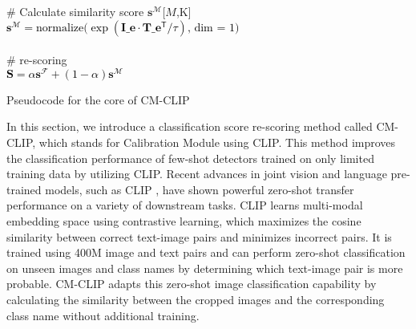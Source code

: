 \documentclass{article}
\newcommand{\PyComment}[1]{\ttfamily\textcolor{commentcolor}{\# #1}}  %
\newcommand{\PyCode}[1]{\ttfamily\textcolor{black}{#1}} %
\begin{document}
\begin{algorithm}[!b]
        \PyComment{Calculate similarity score $\mathbf{s}^\mathcal{M}$[$M$,K] }\\
        \PyCode{ $\mathbf{s}^\mathcal{M} =  \text{normalize(}{\exp(\mathbf{I\_e} \cdot \mathbf{T\_e^\mathsf{T}} \slash \tau )} \text{, dim = 1)}$ }\\
        \PyCode{}\\

        \PyComment{re-scoring }\\
        
        \PyCode{$\mathbf{S} = \alpha \mathbf{s}^\mathcal{F} + (1-\alpha) \mathbf{s}^\mathcal{M}$}
        
    \Indm
    
\caption{Pseudocode for the core of CM-CLIP}
\label{algo:your-algo}
\end{algorithm}

In this section, we introduce a classification score re-scoring method called CM-CLIP, which stands for Calibration Module using CLIP. 
This method improves the classification performance of few-shot detectors trained on only limited training data by utilizing CLIP.
Recent advances in joint vision and language pre-trained models, such as CLIP \cite{clip}, have shown powerful zero-shot transfer performance on a variety of downstream tasks.
CLIP learns multi-modal embedding space using contrastive learning, which maximizes the cosine similarity between correct text-image pairs and minimizes incorrect pairs. It is trained using 400M  image and text pairs and can perform zero-shot classification on unseen images and class names by determining which text-image pair is more probable. 
CM-CLIP adapts this zero-shot image classification capability by calculating the similarity between the cropped images and the corresponding class name without additional training.
\end{document}
